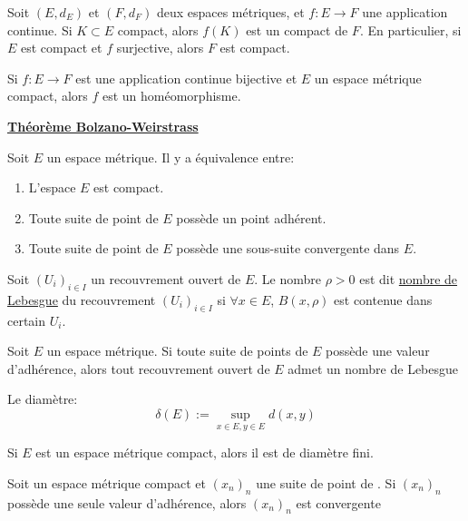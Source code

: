 \documentclass[12pt,a4paper]{article}
\begin{document}
\begin{flushleft}
\begin{thm}
Soit $(E,d_E)$ et $(F,d_F)$ deux espaces métriques, et $f: E \longrightarrow F$ une application continue. Si $K \subset E$ compact, alors $f(K)$ est un compact de $F$. En particulier, si $E$ est compact et $f$ surjective, alors $F$ est compact.
\end{thm}


\begin{cor}
Si $f: E \longrightarrow F$ est une application continue bijective et $E$ un espace métrique compact, alors $f$ est un homéomorphisme.
\end{cor}

\underline{\textbf{Théorème Bolzano-Weirstrass}}
\begin{thm}
Soit $E$ un espace métrique. Il y a équivalence entre:
\begin{enumerate}
\item L'espace $E$ est compact.
\item Toute suite de point de $E$ possède un point adhérent.
\item Toute suite de point de $E$ possède une sous-suite convergente dans $E$.
\end{enumerate}
\end{thm}

\begin{rap}
Soit $(U_i)_{i \in I}$ un recouvrement ouvert de $E$. Le nombre $\rho > 0$ est dit \underline{nombre de Lebesgue} du recouvrement $(U_i)_{i \in I}$ si $\forall x \in E$, $B(x, \rho )$ est contenue dans certain $U_i$.
\end{rap}

\begin{lem}
Soit $E$ un espace métrique. Si toute suite de points de $E$ possède une valeur d'adhérence, alors tout recouvrement ouvert de $E$ admet un nombre de Lebesgue
\end{lem}

\begin{rap}
Le diamètre: $$\delta (E) := \sup\limits_{x \in E , y \in E} d(x,y)$$
\end{rap}

\begin{thm}
Si $E$ est un espace métrique compact, alors il est de diamètre fini.
\end{thm}

\begin{thm}
Soit \edm un espace métrique compact et $(x_n)_n$ une suite de point de \edm . Si $(x_n)_n$ possède une seule valeur d'adhérence, alors $(x_n)_n$ est convergente
\end{thm}


\end{flushleft}
\end{document}
